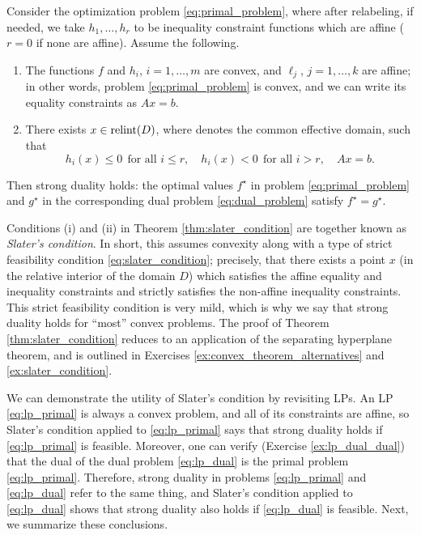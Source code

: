 \begin{Theorem}
\label{thm:slater_condition}
Consider the optimization problem \eqref{eq:primal_problem}, where after 
relabeling, if needed, we take $h_1, \dots, h_r$ to be inequality constraint
functions which are affine ($r = 0$ if none are affine). Assume the following.         

\begin{enumerate}[label=(\roman*)]
\item The functions $f$ and $h_i$, $i=1,\dots,m$ are convex, and $\ell_j$,
  $j=1,\dots,k$ are affine; in other words, problem \eqref{eq:primal_problem} is
  convex, and we can write its equality constraints as $Ax = b$.      

\item There exists $x \in \operatorname{relint}(D)$, where  denotes the common effective domain, such that      
  \begin{equation}
  \label{eq:slater_condition}
  h_i(x) \leq 0 \;\, \text{for all $i \leq r$}, \quad
  h_i(x) < 0 \;\, \text{for all $i > r$}, \quad Ax = b. 
  \end{equation}
\end{enumerate}

Then strong duality holds: the optimal values $f^\star$ in problem
\eqref{eq:primal_problem} and $g^\star$ in the corresponding dual problem  
\eqref{eq:dual_problem} satisfy $f^\star = g^\star$. 
\end{Theorem}

Conditions (i) and (ii) in Theorem \ref{thm:slater_condition} are together known
as \emph{Slater's condition}. In short, this assumes convexity along with a
type of strict feasibility condition \eqref{eq:slater_condition}; precisely,
that there exists a point $x$ (in the relative interior of the domain $D$) which 
satisfies the affine equality and inequality constraints and strictly satisfies  
the non-affine inequality constraints. This strict feasibility condition is very
mild, which is why we say that strong duality holds for ``most'' convex
problems. The proof of Theorem \ref{thm:slater_condition} reduces to an
application of the separating hyperplane theorem, and is outlined in Exercises 
\ref{ex:convex_theorem_alternatives} and \ref{ex:slater_condition}.  

We can demonstrate the utility of Slater's condition by revisiting LPs. An LP
\eqref{eq:lp_primal} is always a convex problem, and all of its constraints are
affine, so Slater's condition applied to \eqref{eq:lp_primal} says that strong
duality holds if \eqref{eq:lp_primal} is feasible. Moreover, one can verify
(Exercise \ref{ex:lp_dual_dual}) that the dual of the dual problem
\eqref{eq:lp_dual} is the primal problem \eqref{eq:lp_primal}. Therefore, strong
duality in problems \eqref{eq:lp_primal} and \eqref{eq:lp_dual} refer to the
same thing, and Slater's condition applied to \eqref{eq:lp_dual} shows that
strong duality also holds if \eqref{eq:lp_dual} is feasible. Next, we summarize
these conclusions.  

